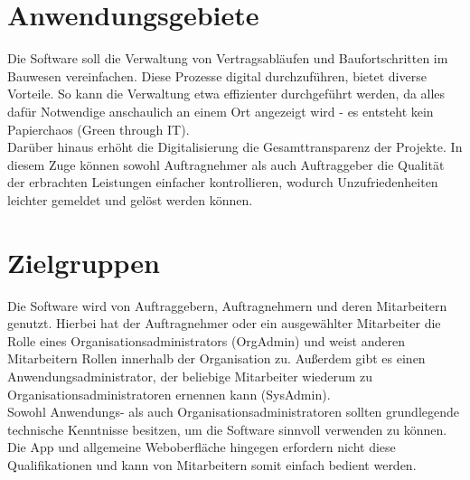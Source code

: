 \section{Anwendungsgebiete}
Die Software soll die Verwaltung von Vertragsabläufen und Baufortschritten im Bauwesen vereinfachen.
Diese Prozesse digital durchzuführen, bietet diverse Vorteile.
So kann die Verwaltung etwa effizienter durchgeführt werden, da alles dafür Notwendige anschaulich an einem Ort angezeigt wird - es entsteht kein Papierchaos (Green through IT).\\
Darüber hinaus erhöht die Digitalisierung die Gesamttransparenz der Projekte.
In diesem Zuge können sowohl Auftragnehmer als auch Auftraggeber die Qualität der erbrachten Leistungen einfacher kontrollieren, wodurch Unzufriedenheiten leichter gemeldet und gelöst werden können.

\section{Zielgruppen}
Die Software wird von Auftraggebern, Auftragnehmern und deren Mitarbeitern genutzt.
Hierbei hat der Auftragnehmer oder ein ausgewählter Mitarbeiter die Rolle eines Organisationsadministrators (OrgAdmin) und weist anderen Mitarbeitern Rollen innerhalb der Organisation zu.
Außerdem gibt es einen Anwendungsadministrator, der beliebige Mitarbeiter wiederum zu Organisationsadministratoren ernennen kann (SysAdmin).\\
Sowohl Anwendungs- als auch Organisationsadministratoren sollten grundlegende technische Kenntnisse besitzen, um die Software sinnvoll verwenden zu können.
Die App und allgemeine Weboberfläche hingegen erfordern nicht diese Qualifikationen und kann von Mitarbeitern somit einfach bedient werden.
